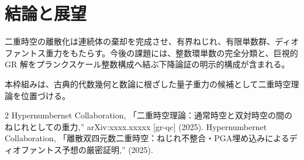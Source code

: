 \documentclass[dvipdfmx,11pt,a4paper]{article}
\begin{document}
\section{結論と展望}
\label{sec:conclusions}

二重時空の離散化は連続体の棄却を完成させ、有界ねじれ、有限単数群、ディオファントス重力をもたらす。今後の課題には、整数環単数の完全分類と、巨視的 GR 解をプランクスケール整数構成へ結ぶ下降論証の明示的構成が含まれる。

本枠組みは、古典的代数幾何と数論に根ざした量子重力の候補として二重時空理論を位置づける。


\begin{thebibliography}{2}
Hypernumbernet Collaboration,
「二重時空理論：通常時空と双対時空の間のねじれとしての重力,''
arXiv:xxxx.xxxxx [gr-qc] (2025).
Hypernumbernet Collaboration,
「離散双四元数二重時空：ねじれ不整合・PGA埋め込みによるディオファントス予想の厳密証明,''
(2025).
\end{thebibliography}
\end{document}
